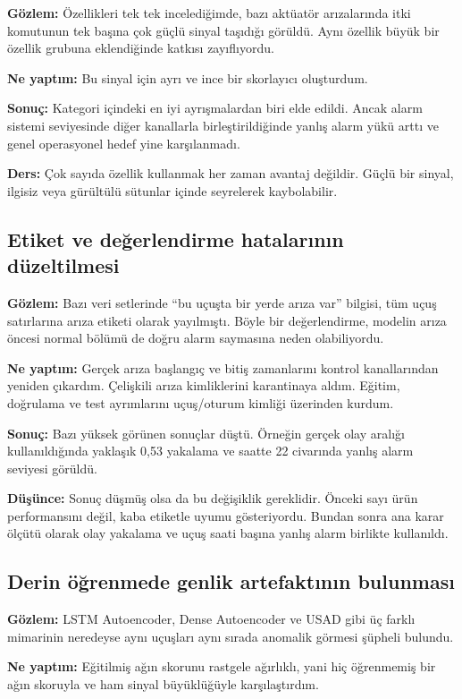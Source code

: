 \documentclass[11pt,a4paper]{article}
\begin{document}
\textbf{Gözlem:} Özellikleri tek tek incelediğimde, bazı aktüatör arızalarında
itki komutunun tek başına çok güçlü sinyal taşıdığı görüldü. Aynı özellik büyük
bir özellik grubuna eklendiğinde katkısı zayıflıyordu.

\textbf{Ne yaptım:} Bu sinyal için ayrı ve ince bir skorlayıcı oluşturdum.

\textbf{Sonuç:} Kategori içindeki en iyi ayrışmalardan biri elde edildi.
Ancak alarm sistemi seviyesinde diğer kanallarla birleştirildiğinde yanlış alarm
yükü arttı ve genel operasyonel hedef yine karşılanmadı.

\textbf{Ders:} Çok sayıda özellik kullanmak her zaman avantaj değildir. Güçlü
bir sinyal, ilgisiz veya gürültülü sütunlar içinde seyrelerek kaybolabilir.

\subsection{Etiket ve değerlendirme hatalarının düzeltilmesi}

\textbf{Gözlem:} Bazı veri setlerinde ``bu uçuşta bir yerde arıza var'' bilgisi,
tüm uçuş satırlarına arıza etiketi olarak yayılmıştı. Böyle bir değerlendirme,
modelin arıza öncesi normal bölümü de doğru alarm saymasına neden olabiliyordu.

\textbf{Ne yaptım:} Gerçek arıza başlangıç ve bitiş zamanlarını kontrol
kanallarından yeniden çıkardım. Çelişkili arıza kimliklerini karantinaya aldım.
Eğitim, doğrulama ve test ayrımlarını uçuş/oturum kimliği üzerinden kurdum.

\textbf{Sonuç:} Bazı yüksek görünen sonuçlar düştü. Örneğin gerçek olay aralığı
kullanıldığında yaklaşık 0{,}53 yakalama ve saatte 22 civarında yanlış alarm
seviyesi görüldü.

\textbf{Düşünce:} Sonuç düşmüş olsa da bu değişiklik gereklidir. Önceki sayı
ürün performansını değil, kaba etiketle uyumu gösteriyordu. Bundan sonra ana
karar ölçütü olarak olay yakalama ve uçuş saati başına yanlış alarm birlikte
kullanıldı.

\subsection{Derin öğrenmede genlik artefaktının bulunması}

\textbf{Gözlem:} LSTM Autoencoder, Dense Autoencoder ve USAD gibi üç farklı
mimarinin neredeyse aynı uçuşları aynı sırada anomalik görmesi şüpheli bulundu.

\textbf{Ne yaptım:} Eğitilmiş ağın skorunu rastgele ağırlıklı, yani hiç
öğrenmemiş bir ağın skoruyla ve ham sinyal büyüklüğüyle karşılaştırdım.
\end{document}
